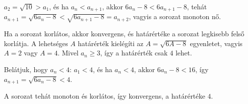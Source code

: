 \documentclass[11pt]{scrartcl}
\begin{document}
$a_2 = \sqrt{10} > a_1$, és ha $a_n < a_{n + 1}$, akkor
$6a_n - 8 < 6a_{n + 1} - 8$, tehát
\(
a_{n + 1} = \sqrt{6a_n - 8} < \sqrt{6a_{n + 1} - 8} = a_{n + 2}
\),
vagyis a sorozat monoton nő.

Ha a sorozat korlátos, akkor konvergens, és határértéke a sorozat legkisebb
felső korlátja. A lehetséges $A$ határérték kielégíti az
$A = \sqrt{6A - 8}$ egyenletet, vagyis $A = 2$ vagy $A = 4$. Mivel
$a_n \ge 3$, így a határérték csak $4$ lehet.

Belátjuk, hogy $a_n < 4$: $a_1 < 4$, és ha $a_n < 4$, akkor $6a_n - 8 < 16$,
így $a_{n + 1} = \sqrt{6a_n - 8} < 4$.

A sorozat tehát monoton és korlátos, így konvergens, a határértéke $4$.
\end{document}

